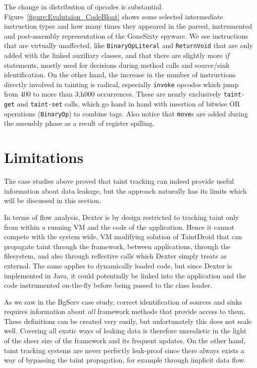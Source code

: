 \documentclass[12pt,twoside,notitlepage]{report}
\begin{document}
The change in distribution of opcodes is substantial. Figure~\ref{figure:Evalutaion_CodeBloat} shows some selected intermediate instruction types and how many times they appeared in the parsed, instrumented and post-assembly representation of the GoneSixty spyware. We see instructions that are virtually unaffected, like \verb$BinaryOpLiteral$ and \verb$ReturnVoid$ that are only added with the linked auxiliary classes, and that there are slightly more \emph{if} statements, mostly used for decisions during method calls and source/sink identification. On the other hand, the increase in the number of instructions directly involved in tainting is radical, especially \verb$invoke$ opcodes which jump from 400 to more than 3,h000 occurrences. These are nearly exclusively \verb$taint-get$ and \verb$taint-set$ calls, which go hand in hand with insertion of bitwise OR operations (\verb$BinaryOp$) to combine tags. Also notice that \verb$move$s are added during the assembly phase as a result of register spilling.

\section{Limitations}

The case studies above proved that taint tracking can indeed provide useful information about data leakage, but the approach naturally has its limits which will be discussed in this section. 

In terms of flow analysis, Dexter is by design restricted to tracking taint only from within a running VM and the code of the application. Hence it cannot compete with the system wide, VM modifying solution of TaintDroid that can propagate taint through the framework, between applications, through the filesystem, and also through reflective calls which Dexter simply treats as external. The same applies to dynamically loaded code, but since Dexter is implemented in Java, it could potentially be linked into the application and the code instrumented on-the-fly before being passed to the class loader.

As we saw in the BgServ case study, correct identification of sources and sinks requires information about \emph{all} framework methods that provide access to them. These definitions can be created very easily, but unfortunately this does not scale well. Covering all exotic ways of leaking data is therefore unrealistic in the light of the sheer size of the framework and its frequent updates. On the other hand, taint tracking systems are never perfectly leak-proof since there always exists a way of bypassing the taint propagation, for example through implicit data flow.
\end{document}
